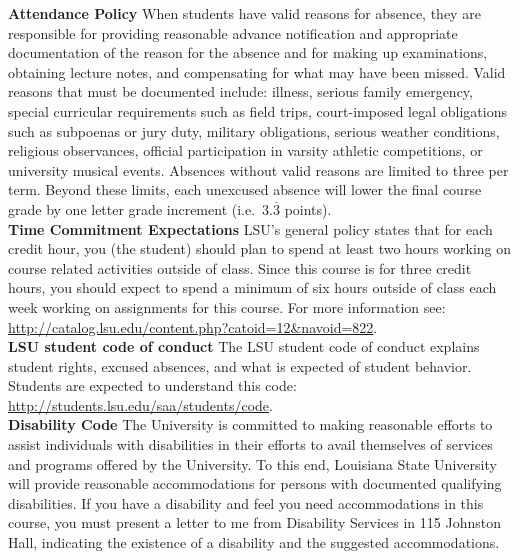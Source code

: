 \documentclass[11pt,article,oneside]{memoir}
\begin{document}
\noindent \textbf{Attendance Policy}
When students have valid reasons for absence, they are responsible for providing reasonable advance notification and appropriate documentation of the reason for the absence and for making up examinations, obtaining lecture notes, and compensating for what may have been missed. Valid reasons that must be documented include: illness, serious family emergency, special curricular requirements such as field trips, court-imposed legal obligations such as subpoenas or jury duty, military obligations, serious weather conditions, religious observances, official participation in varsity athletic competitions, or university musical events. Absences without valid reasons are limited to three per term. Beyond these limits, each unexcused absence will lower the final course grade by one letter grade increment (i.e.~$3.\overline{3}$ points).\\

\noindent \textbf{Time Commitment Expectations}
LSU's general policy states that for each credit hour, you (the student) should plan to
spend at least two hours working on course related activities outside of class. Since this course is for three credit hours, you should expect to spend a minimum of six hours outside of class each week working on assignments for this course. For more information see: 
\url{http://catalog.lsu.edu/content.php?catoid=12&navoid=822}.\\

\noindent \textbf{LSU student code of conduct}
The LSU student code of conduct explains student rights, excused absences, and what is expected of student behavior. Students are expected to understand this code:  \url{http://students.lsu.edu/saa/students/code}.\\ %

\noindent \textbf{Disability Code}
The University is committed to making reasonable efforts to assist individuals with disabilities in
their efforts to avail themselves of services and programs offered by the University. To this end,
Louisiana State University will provide reasonable accommodations for persons with
documented qualifying disabilities. If you have a disability and feel you need accommodations in
this course, you must present a letter to me from Disability Services in 115 Johnston Hall,
indicating the existence of a disability and the suggested accommodations.\\
\end{document}
